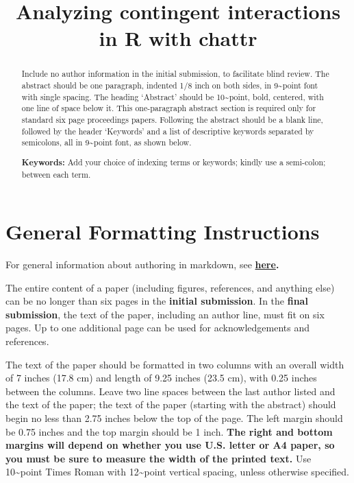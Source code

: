 \documentclass[10pt, letterpaper]{article}
\title{Analyzing contingent interactions in R with chattr}
\begin{document}
\maketitle

\begin{abstract}
Include no author information in the initial submission, to facilitate
blind review. The abstract should be one paragraph, indented 1/8 inch on
both sides, in 9\textasciitilde point font with single spacing. The
heading `Abstract' should be 10\textasciitilde point, bold, centered,
with one line of space below it. This one-paragraph abstract section is
required only for standard six page proceedings papers. Following the
abstract should be a blank line, followed by the header `Keywords' and a
list of descriptive keywords separated by semicolons, all in
9\textasciitilde point font, as shown below.

\textbf{Keywords:}
Add your choice of indexing terms or keywords; kindly use a semi-colon;
between each term.
\end{abstract}

\hypertarget{general-formatting-instructions}{%
\section{General Formatting
Instructions}\label{general-formatting-instructions}}

For general information about authoring in markdown, see
\textbf{\href{http://rmarkdown.rstudio.com/authoring_basics.html}{here}.}

The entire content of a paper (including figures, references, and
anything else) can be no longer than six pages in the
\textbf{initial submission}. In the \textbf{final submission}, the text
of the paper, including an author line, must fit on six pages. Up to one
additional page can be used for acknowledgements and references.

The text of the paper should be formatted in two columns with an overall
width of 7 inches (17.8 cm) and length of 9.25 inches (23.5 cm), with
0.25 inches between the columns. Leave two line spaces between the last
author listed and the text of the paper; the text of the paper (starting
with the abstract) should begin no less than 2.75 inches below the top
of the page. The left margin should be 0.75 inches and the top margin
should be 1 inch. \textbf{The right and bottom margins will depend on
whether you use U.S. letter or A4 paper, so you must be sure to
measure the width of the printed text.} Use 10\textasciitilde point
Times Roman with 12\textasciitilde point vertical spacing, unless
otherwise specified.
\end{document}
